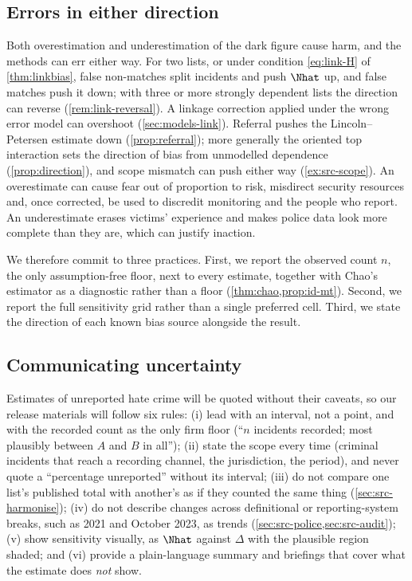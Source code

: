 \subsection{Errors in either direction}\label{sec:ethics-errors}

Both overestimation and underestimation of the dark figure cause harm, and the methods can err either way. For two lists, or under condition \eqref{eq:link-H} of \cref{thm:linkbias}, false non-matches split incidents and push $\Nhat$ up, and false matches push it down; with three or more strongly dependent lists the direction can reverse (\cref{rem:link-reversal}). A linkage correction applied under the wrong error model can overshoot (\cref{sec:models-link}). Referral pushes the Lincoln--Petersen estimate down (\cref{prop:referral}); more generally the oriented top interaction sets the direction of bias from unmodelled dependence (\cref{prop:direction}), and scope mismatch can push either way (\cref{ex:src-scope}). An overestimate can cause fear out of proportion to risk, misdirect security resources and, once corrected, be used to discredit monitoring and the people who report. An underestimate erases victims' experience and makes police data look more complete than they are, which can justify inaction.

We therefore commit to three practices. First, we report the observed count $n$, the only assumption-free floor, next to every estimate, together with Chao's estimator as a diagnostic rather than a floor (\cref{thm:chao,prop:id-mt}). Second, we report the full sensitivity grid rather than a single preferred cell. Third, we state the direction of each known bias source alongside the result.

\subsection{Communicating uncertainty}\label{sec:ethics-communication}

Estimates of unreported hate crime will be quoted without their caveats, so our release materials will follow six rules: (i) lead with an interval, not a point, and with the recorded count as the only firm floor (``$n$ incidents recorded; most plausibly between $A$ and $B$ in all''); (ii) state the scope every time (criminal incidents that reach a recording channel, the jurisdiction, the period), and never quote a ``percentage unreported'' without its interval; (iii) do not compare one list's published total with another's as if they counted the same thing (\cref{sec:src-harmonise}); (iv) do not describe changes across definitional or reporting-system breaks, such as 2021 and October 2023, as trends (\cref{sec:src-police,sec:src-audit}); (v) show sensitivity visually, as $\Nhat$ against $\Delta$ with the plausible region shaded; and (vi) provide a plain-language summary and briefings that cover what the estimate does \emph{not} show.

